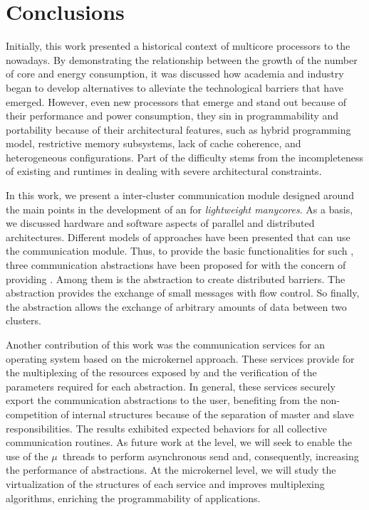 \chapter{Conclusions}
\label{ch.conclusions}

Initially, this work presented a historical context of multicore
processors to the nowadays.
By demonstrating the relationship between the growth of the number
of core and energy consumption, it was discussed how academia and
industry began to develop alternatives to alleviate the technological
barriers that have emerged.
However, even new processors that emerge and stand out because of
their performance and power consumption,
they sin in programmability and portability because of their architectural
features, such as hybrid programming model, restrictive memory subsystems,
lack of cache coherence, and heterogeneous configurations.
Part of the difficulty stems from the incompleteness of existing \oss and
runtimes in dealing with severe architectural constraints.

In this work, we present a inter-cluster communication module
designed around the main points in the development of an \os for \textit{lightweight manycores}.
As a basis, we discussed hardware and software aspects of parallel
and distributed architectures.
Different models of \os approaches have been presented that can
use the communication module.
Thus, to provide the basic functionalities for such \oss, three
communication abstractions have been proposed for \hal with the
concern of providing \qos.
Among them is the \sync abstraction to create distributed barriers.
The \mailbox abstraction provides the exchange of small messages
with flow control.
So finally, the \portal abstraction allows the exchange of
arbitrary amounts of data between two clusters.

Another contribution of this work was the communication services
for an operating system based on the microkernel approach.
These services provide for the multiplexing of the resources
exposed by \hal and the verification of the parameters required
for each abstraction.
In general, these services securely export the communication
abstractions to the user, benefiting from the non-competition
of \os internal structures because of the separation of master
and slave responsibilities.
The results exhibited expected behaviors for all \mpi collective
communication routines. As future work at the \hal level, we will
seek to enable the use of the $\mu$~threads to perform asynchronous
send and, consequently, increasing the performance of abstractions.
At the microkernel level, we will study the virtualization of the
structures of each service and improves multiplexing algorithms,
enriching the programmability of applications.